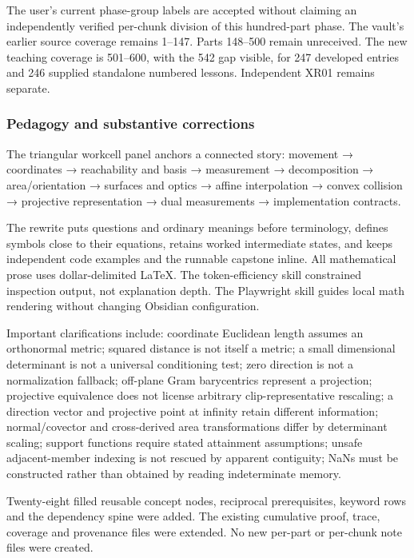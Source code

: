 The user's current phase-group labels are accepted without claiming an independently verified per-chunk division of this hundred-part phase. The vault's earlier source coverage remains 1--147. Parts 148--500 remain unreceived. The new teaching coverage is 501--600, with the 542 gap visible, for 247 developed entries and 246 supplied standalone numbered lessons. Independent XR01 remains separate.

\subsubsection{Pedagogy and substantive corrections}\label{appendix-a103e7846d21-pedagogy-and-substantive-corrections}

\hypertarget{appendix-a103e7846d21-pedagogy-and-substantive-corrections}{}

The triangular workcell panel anchors a connected story: movement → coordinates → reachability and basis → measurement → decomposition → area/orientation → surfaces and optics → affine interpolation → convex collision → projective representation → dual measurements → implementation contracts.

The rewrite puts questions and ordinary meanings before terminology, defines symbols close to their equations, retains worked intermediate states, and keeps independent code examples and the runnable capstone inline. All mathematical prose uses dollar-delimited LaTeX. The token-efficiency skill constrained inspection output, not explanation depth. The Playwright skill guides local math rendering without changing Obsidian configuration.

Important clarifications include: coordinate Euclidean length assumes an orthonormal metric; squared distance is not itself a metric; a small dimensional determinant is not a universal conditioning test; zero direction is not a normalization fallback; off-plane Gram barycentrics represent a projection; projective equivalence does not license arbitrary clip-representative rescaling; a direction vector and projective point at infinity retain different information; normal/covector and cross-derived area transformations differ by determinant scaling; support functions require stated attainment assumptions; unsafe adjacent-member indexing is not rescued by apparent contiguity; NaNs must be constructed rather than obtained by reading indeterminate memory.

Twenty-eight filled reusable concept nodes, reciprocal prerequisites, keyword rows and the dependency spine were added. The existing cumulative proof, trace, coverage and provenance files were extended. No new per-part or per-chunk note files were created.

